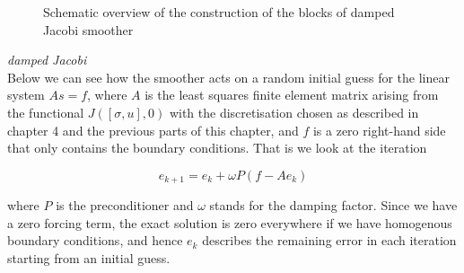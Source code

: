 \documentclass[../draft_1.tex]{subfiles}
\begin{document}
\begin{figure}[ht!]
	\centering
	\caption{Schematic overview of the construction of the blocks of damped Jacobi smoother}
\end{figure}

\textit{damped Jacobi} \\
Below we can see how the smoother acts on a random initial guess for the linear system $As = f$, where $A$ is the least squares finite element matrix arising from the functional $J([\sigma, u], 0)$ with the discretisation chosen as described in chapter 4 and the previous parts of this chapter, and $f$ is a zero right-hand side that only contains the boundary conditions. That is we look at the iteration 
\begin{ceqn}
	\begin{equation}
	e_{k+1} = e_k + \omega P (f - Ae_k)
	\end{equation}
\end{ceqn}
where $P$ is the preconditioner and $\omega$ stands for the damping factor. Since we have a zero forcing term, the exact solution is zero everywhere if we have homogenous boundary conditions, and hence $e_k$ describes the remaining error in each iteration starting from an initial guess. 
\end{document}
